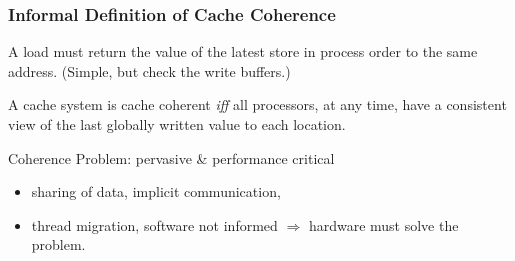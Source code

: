 \documentclass{beamer}
\begin{document}
\begin{frame}[fragile,t]
\frametitle{Informal Definition of Cache Coherence}

\begin{definition}
A load must return the value of the latest store 
in process order to the same address. (Simple, but check the write buffers.)
\end{definition}

\begin{definition}
A cache system is cache coherent {\em iff} all processors, 
at any time, have a consistent view of the last 
globally written value to each location.
\end{definition}

\medskip

\alert{Coherence Problem: pervasive \& performance critical}
\begin{scriptsize}
\begin{itemize}
    \item sharing of data, implicit communication, 
    \item thread migration, software not informed $\Rightarrow$ hardware must solve the problem.
\end  {itemize}
\end {scriptsize}

\end{frame}
\end{document}
